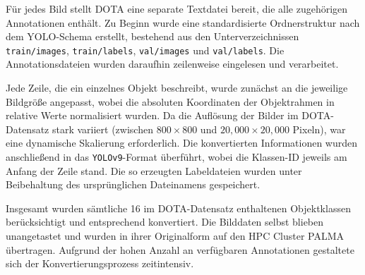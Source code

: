 Für jedes Bild stellt \acrshort{DOTA} eine separate Textdatei bereit, die alle zugehörigen Annotationen enthält. Zu Beginn wurde eine standardisierte Ordnerstruktur nach dem \acrshort{YOLO}-Schema erstellt, bestehend aus den Unterverzeichnissen \texttt{train/images}, \texttt{train/labels}, \texttt{val/images} und \texttt{val/labels}. Die Annotationsdateien wurden daraufhin zeilenweise eingelesen und verarbeitet.

Jede Zeile, die ein einzelnes Objekt beschreibt, wurde zunächst an die jeweilige Bildgröße angepasst, wobei die absoluten Koordinaten der Objektrahmen in relative Werte normalisiert wurden. Da die Auflösung der Bilder im \acrshort{DOTA}-Datensatz stark variiert (zwischen \(800 \times 800\) und \(20{,}000 \times 20{,}000\) Pixeln), war eine dynamische Skalierung erforderlich. Die konvertierten Informationen wurden anschließend in das \texttt{YOLOv9}-Format überführt, wobei die Klassen-ID jeweils am Anfang der Zeile stand. Die so erzeugten Labeldateien wurden unter Beibehaltung des ursprünglichen Dateinamens gespeichert.

Insgesamt wurden sämtliche 16 im \acrshort{DOTA}-Datensatz enthaltenen Objektklassen berücksichtigt und entsprechend konvertiert. Die Bilddaten selbst blieben unangetastet und wurden in ihrer Originalform auf den HPC Cluster \acrshort{PALMA} übertragen. Aufgrund der hohen Anzahl an verfügbaren Annotationen gestaltete sich der Konvertierungsprozess zeitintensiv.

